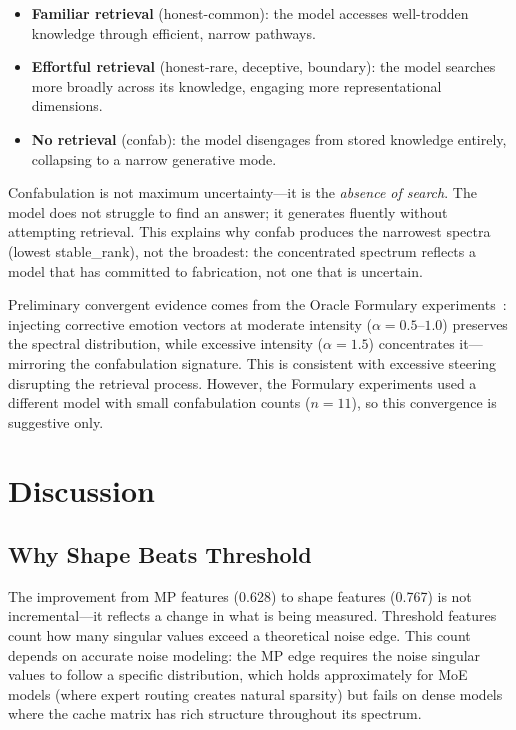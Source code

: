\documentclass[11pt,a4paper]{article}
\begin{document}
\begin{itemize}
\item \textbf{Familiar retrieval} (honest-common): the model accesses
  well-trodden knowledge through efficient, narrow pathways.
\item \textbf{Effortful retrieval} (honest-rare, deceptive, boundary):
  the model searches more broadly across its knowledge, engaging more
  representational dimensions.
\item \textbf{No retrieval} (confab): the model disengages from
  stored knowledge entirely, collapsing to a narrow generative mode.
\end{itemize}

Confabulation is not maximum uncertainty---it is the \emph{absence of
  search}. The model does not struggle to find an answer; it generates
fluently without attempting retrieval. This explains why confab
produces the narrowest spectra (lowest stable\_rank), not the
broadest: the concentrated spectrum reflects a model that has committed
to fabrication, not one that is uncertain.

Preliminary convergent evidence comes from the Oracle Formulary
experiments~\citep{lyra_p6}: injecting corrective emotion vectors at
moderate intensity ($\alpha = 0.5$--$1.0$) preserves the spectral
distribution, while excessive intensity ($\alpha = 1.5$) concentrates
it---mirroring the confabulation signature. This is consistent with
excessive steering disrupting the retrieval process. However, the
Formulary experiments used a different model with small confabulation
counts ($n=11$), so this convergence is suggestive only.

\section{Discussion}
\label{sec:discussion}

\subsection{Why Shape Beats Threshold}

The improvement from MP features (0.628) to shape features (0.767) is
not incremental---it reflects a change in what is being measured.
Threshold features count how many singular values exceed a theoretical
noise edge. This count depends on accurate noise modeling: the MP edge
requires the noise singular values to follow a specific distribution,
which holds approximately for MoE models (where expert routing creates
natural sparsity) but fails on dense models where the cache matrix has
rich structure throughout its spectrum.
\end{document}
